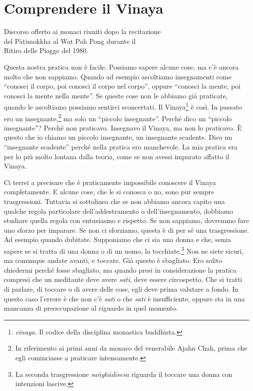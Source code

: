 \chapter{Comprendere il Vinaya}

\begin{openingQuote}
  \centering

  Discorso offerto ai monaci riuniti dopo la recitazione\\
  del Pāṭimokkha al Wat Pah Pong durante il\\
  Ritiro delle Piogge del 1980.
\end{openingQuote}

Questa nostra pratica non è facile. Possiamo sapere alcune cose, ma c'è
ancora molto che non sappiamo. Quando ad esempio ascoltiamo insegnamenti
come ``conosci il corpo, poi conosci il corpo nel corpo'', oppure
``conosci la mente, poi conosci la mente nella mente''. Se queste cose
non le abbiamo già praticate, quando le ascoltiamo possiamo sentirci
sconcertati. Il Vinaya\footnote{\emph{vinaya.} Il codice della disciplina
  monastica buddhista.} è così. In passato ero un insegnante,\footnote{In
  riferimento ai primi anni da monaco del venerabile Ajahn Chah, prima
  che egli cominciasse a praticare intensamente.} ma solo un ``piccolo
insegnante''. Perché dico un ``piccolo insegnante''? Perché non
praticavo. Insegnavo il Vinaya, ma non lo praticavo. È questo che io
chiamo un piccolo insegnante, un insegnante scadente. Dico un
``insegnante scadente'' perché nella pratica ero manchevole. La mia
pratica era per lo più molto lontana dalla teoria, come se non avessi
imparato affatto il Vinaya.

Ci terrei a precisare che è praticamente impossibile conoscere il Vinaya
completamente. E alcune cose, che le si conosca o no, sono pur sempre
trasgressioni. Tuttavia si sottolinea che se non abbiamo ancora capito
una qualche regola particolare dell'addestramento o dell'insegnamento,
dobbiamo studiare quella regola con entusiasmo e rispetto. Se non
sappiamo, dovremmo fare uno sforzo per imparare. Se non ci sforziamo,
questa è di per sé una trasgressione. Ad esempio quando dubitate.
Supponiamo che ci sia una donna e che, senza sapere se si tratta di una
donna o di un uomo, la tocchiate.\footnote{La seconda trasgressione
  \emph{saṅghādisesa} riguarda il toccare una donna con intenzioni
  lascive.} Non ne siete sicuri, ma comunque andate avanti, e toccate.
Già questo è sbagliato. Ero solito chiedermi perché fosse sbagliato, ma
quando presi in considerazione la pratica compresi che un meditante deve
avere \emph{sati}, deve essere circospetto. Che si tratti di parlare, di
toccare o di avere delle cose, egli deve prima valutare a fondo. In
questo caso l'errore è che non c'è \emph{sati} o che \emph{sati} è
insufficiente, oppure sta in una mancanza di preoccupazione al riguardo
in quel momento.

